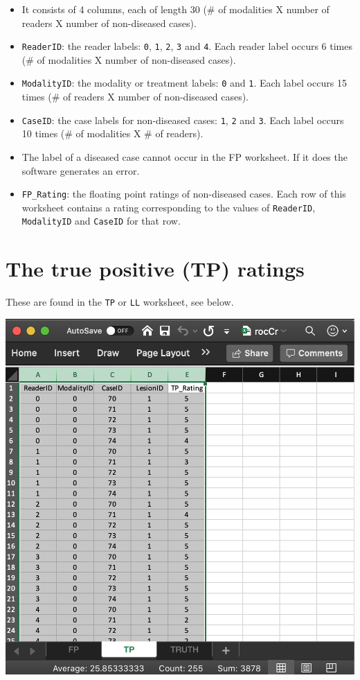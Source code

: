 \documentclass[
]{book}
\providecommand{\tightlist}{%
  \setlength{\itemsep}{0pt}\setlength{\parskip}{0pt}}
\begin{document}
\begin{itemize}
\tightlist
\item
  It consists of 4 columns, each of length 30 (\# of modalities X number of readers X number of non-diseased cases).
\item
  \texttt{ReaderID}: the reader labels: \texttt{0}, \texttt{1}, \texttt{2}, \texttt{3} and \texttt{4}. Each reader label occurs 6 times (\# of modalities X number of non-diseased cases).
\item
  \texttt{ModalityID}: the modality or treatment labels: \texttt{0} and \texttt{1}. Each label occurs 15 times (\# of readers X number of non-diseased cases).
\item
  \texttt{CaseID}: the case labels for non-diseased cases: \texttt{1}, \texttt{2} and \texttt{3}. Each label occurs 10 times (\# of modalities X \# of readers).
\item
  The label of a diseased case cannot occur in the FP worksheet. If it does the software generates an error.
\item
  \texttt{FP\_Rating}: the floating point ratings of non-diseased cases. Each row of this worksheet contains a rating corresponding to the values of \texttt{ReaderID}, \texttt{ModalityID} and \texttt{CaseID} for that row.
\end{itemize}

\hypertarget{quick-start-data-format-tp-worksheet}{%
\section{The true positive (TP) ratings}\label{quick-start-data-format-tp-worksheet}}

These are found in the \texttt{TP} or \texttt{LL} worksheet, see below.

\includegraphics[width=1\textwidth,height=\textheight]{images/quick-start/rocCrTp.png}
\end{document}
